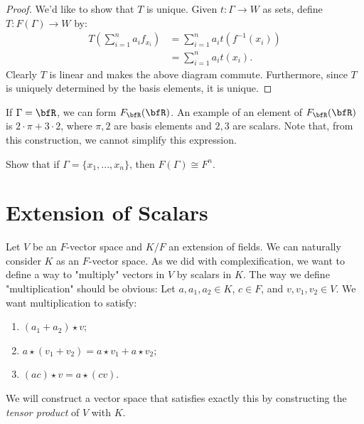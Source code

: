 \begin{proof}
            We'd like to show that $T$ is unique. Given $t:\Gamma \rightarrow W$ as sets, define $T:F(\Gamma) \rightarrow W$ by:
                \begin{equation*}
                \begin{split}
                    T(\sum_{i = 1}^n a_i f_{x_i})
                    & = \sum_{i=1}^n a_i t(f^{-1}(x_i)) \\
                    & = \sum_{i = 1}^n a_i t(x_i).
                \end{split}
                \end{equation*}
            Clearly $T$ is linear and makes the above diagram commute. Furthermore, since $T$ is uniquely determined by the basis elements, it is unique.
        \end{proof}

    \begin{example}
        If $\Gamma = \bfR$, we can form $F_\bfR(\bfR)$. An example of  an element of $F_\bfR(\bfR)$ is $2 \cdot \pi + 3 \cdot 2$, where $\pi,2$ are basis elements and $2,3$ are scalars. Note that, from this construction, we cannot simplify this expression.
    \end{example}

    \begin{exercise}
        Show that if $\Gamma = \{x_1,...,x_n\}$, then $F(\Gamma) \cong F^n$.
    \end{exercise}

\section{Extension of Scalars}
    Let $V$ be an $F$-vector space and $K/F$ an extension of fields. We can naturally consider $K$ as an $F$-vector space. As we did with complexification, we want to define a way to "multiply" vectors in $V$ by scalars in $K$. The way we define "multiplication" should be obvious: Let $a, a_1,a_2 \in K$, $c\in F$, and $v,v_1,v_2 \in V$. We want multiplication to satisfy:
        \begin{enumerate}[label = (\arabic*)]
            \item $(a_1 + a_2) \star v$;
            \item $a \star (v_1 + v_2) = a \star v_1 + a \star v_2$;
            \item $(ac) \star v = a \star (cv)$.
        \end{enumerate}
    We will construct a vector space that satisfies exactly this by constructing the \textit{tensor product} of $V$ with $K$.


